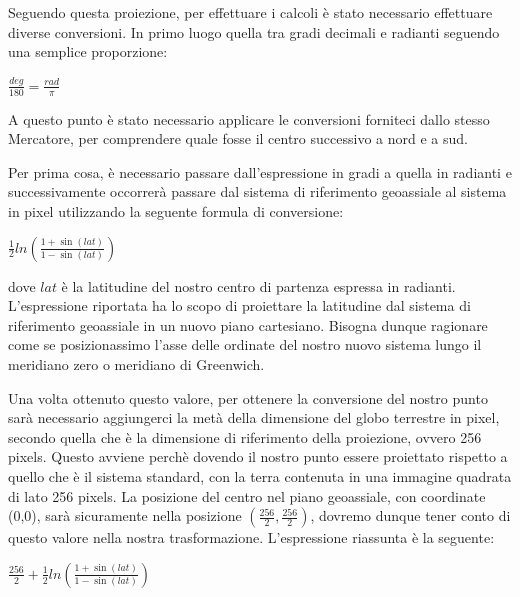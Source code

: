 Seguendo questa proiezione, per effettuare i calcoli è stato necessario effettuare diverse conversioni. In primo luogo quella tra gradi decimali e radianti seguendo una semplice proporzione:
\begin{center}

	\Large$ \frac{deg}{180} = \frac{rad}{\pi} $\par

\end{center}

A questo punto è stato necessario applicare le conversioni forniteci dallo stesso Mercatore, per comprendere quale fosse il centro successivo a nord e a sud. 

Per prima cosa, è necessario passare dall'espressione in gradi a quella in radianti e successivamente occorrerà passare dal sistema di riferimento geoassiale al sistema in pixel utilizzando la seguente formula di conversione:
\begin{center}

	\Large$ \frac{1}{2}ln(\frac{1+\sin(lat)}{1-\sin(lat)}) $\par

\end{center}
dove $lat$ è la latitudine del nostro centro di partenza espressa in radianti. L'espressione riportata ha lo scopo di proiettare la latitudine dal sistema di riferimento geoassiale in un nuovo piano cartesiano. Bisogna dunque ragionare come se posizionassimo l'asse delle ordinate del nostro nuovo sistema lungo il meridiano zero o meridiano di Greenwich.

Una volta ottenuto questo valore, per ottenere la conversione del nostro punto sarà necessario aggiungerci la metà della dimensione del globo terrestre in pixel, secondo quella che è la dimensione di riferimento della proiezione, ovvero 256 pixels. Questo avviene perchè dovendo il nostro punto essere proiettato rispetto a quello che è il sistema standard, con la terra contenuta in una immagine quadrata di lato 256 pixels. La posizione del centro nel piano geoassiale, con coordinate (0,0), sarà sicuramente nella posizione $ (\frac{256}{2}, \frac{256}{2})$, dovremo dunque tener conto di questo valore nella nostra trasformazione. L'espressione riassunta è la seguente:
\begin{center}

	\large$ \frac{256}{2} + \frac{1}{2}ln(\frac{1+\sin(lat)}{1-\sin(lat)}) $\par

\end{center}

